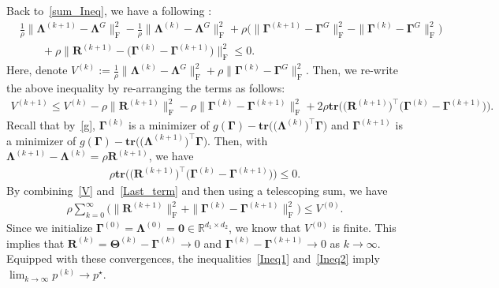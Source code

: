 \documentclass[alpha-refs]{wiley-article}
\begin{document}
Back to~\eqref{sum_Ineq}, we have a following :
\begin{align*}
    &\frac{1}{\rho} \| \boldsymbol{\Lambda}^{(k+1)} - \boldsymbol{\Lambda}^{G} \|_{\text{F}}^{2} - \frac{1}{\rho} \| \boldsymbol{\Lambda}^{(k)} - \boldsymbol{\Lambda}^{G} \|_{\text{F}}^{2}
    + \rho \bigg( \| \boldsymbol{\Gamma}^{(k+1)} - \boldsymbol{\Gamma}^{G} \|_{\text{F}}^{2} 
    - \| \boldsymbol{\Gamma}^{(k)} - \boldsymbol{\Gamma}^{G} \|_{\text{F}}^{2} \bigg) \\
    &\qquad + \rho \| \boldsymbol{R}^{(k+1)} - \big( \boldsymbol{\Gamma}^{(k)} - \boldsymbol{\Gamma}^{(k+1)} \big) \|_{\text{F}}^{2} \leq 0.
\end{align*}
Here, denote $V^{(k)}:=\frac{1}{\rho} \| \boldsymbol{\Lambda}^{(k)} - \boldsymbol{\Lambda}^{G} \|_{\text{F}}^{2} + \rho \| \boldsymbol{\Gamma}^{(k)} - \boldsymbol{\Gamma}^{G} \|_{\text{F}}^{2}$.
Then, we re-write the above inequality by re-arranging the terms as follows:
\begin{align} \label{V}
    V^{(k+1)} \leq V^{(k)} - \rho \| \boldsymbol{R}^{(k+1)} \|_{\text{F}}^{2} - \rho \| \boldsymbol{\Gamma}^{(k)} - \boldsymbol{\Gamma}^{(k+1)} \|_{\text{F}}^{2} + 2 \rho \textbf{tr}\big( \big( \boldsymbol{R}^{(k+1)} \big)^{\top} \big( \boldsymbol{\Gamma}^{(k)} - \boldsymbol{\Gamma}^{(k+1)} \big)\big). 
\end{align}
Recall that by~\eqref{g}, $\boldsymbol{\Gamma}^{(k)}$ is a minimizer of 
$g(\boldsymbol{\Gamma}) - \textbf{tr} \big( \big( \boldsymbol{\Lambda}^{(k)}\big)^{\top} \boldsymbol{\Gamma} \big)$ and 
$\boldsymbol{\Gamma}^{(k+1)}$ is a minimizer of 
$g(\boldsymbol{\Gamma}) - \textbf{tr} \big( \big( \boldsymbol{\Lambda}^{(k+1)}\big)^{\top} \boldsymbol{\Gamma} \big)$.
Then, with $\boldsymbol{\Lambda}^{(k+1)}-\boldsymbol{\Lambda}^{(k)}=\rho\boldsymbol{R}^{(k+1)}$, we have 
\begin{align} \label{Last_term}
    \rho\textbf{tr}\big(\big(\boldsymbol{R}^{(k+1)}\big)^{\top}\big(\boldsymbol{\Gamma}^{(k)}-\boldsymbol{\Gamma}^{(k+1)}\big)\big) \leq 0.
\end{align}
By combining~\eqref{V} and~\eqref{Last_term} and then using a telescoping sum, we have
\begin{align}
    \rho \sum_{k=0}^{\infty}\bigg( \| \boldsymbol{R}^{(k+1)} \|_{\text{F}}^{2} + \| \boldsymbol{\Gamma}^{(k)} - \boldsymbol{\Gamma}^{(k+1)} \|_{\text{F}}^{2} \bigg) \leq V^{(0)}.
\end{align}
Since we initialize $\boldsymbol{\Gamma}^{(0)}=\boldsymbol{\Lambda}^{(0)}=\boldsymbol{0} \in \mathbb{R}^{d_{1} \times d_{2}}$, we know that $V^{(0)}$ is finite.
This implies that $\boldsymbol{R}^{(k)}=\boldsymbol{\Theta}^{(k)}-\boldsymbol{\Gamma}^{(k)}\rightarrow{0}$ and $\boldsymbol{\Gamma}^{(k)} - \boldsymbol{\Gamma}^{(k+1)}\rightarrow{0}$ as $k\rightarrow{\infty}$.
Equipped with these convergences, the inequalities~\eqref{Ineq1} and~\eqref{Ineq2} imply $\lim_{k\rightarrow{\infty}}p^{(k)}\rightarrow{p^{\star}}$.
\end{document}
